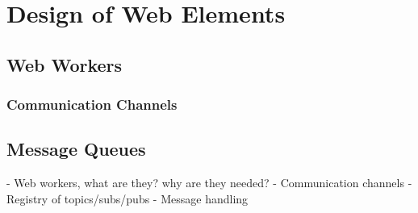 \chapter{Design of Web Elements}\label{cha:web}

\section{Web Workers}

    \subsection{Communication Channels}

\section{Message Queues}


- Web workers, what are they? why are they needed?
- Communication channels
- Registry of topics/subs/pubs
- Message handling